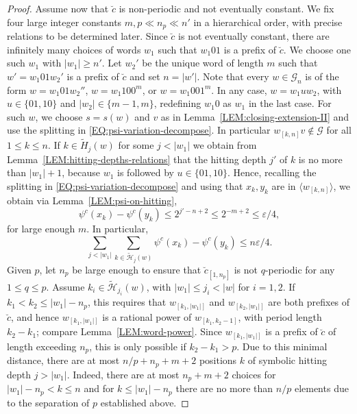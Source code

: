 \documentclass[11pt,reqno]{amsart}
\theoremstyle{plain}
\theoremstyle{definition}
\newcommand{\mc}{\mathcal}
\begin{document}
\begin{proof}
Assume now that $\breve{c}$ is non-periodic and not eventually constant.
We fix four large integer constants $m, p \ll n_p \ll n'$ in a hierarchical order, with precise relations to be determined later. Since $\breve{c}$ is not eventually constant, there are infinitely many choices of words $w_1$ such that $w_1 01$ is a prefix of $\breve{c}$. We choose one such $w_1$ with $|w_1| \geqslant n'$. Let $w_2'$ be the unique word of length $m$ such that $w' = w_1 01 w_2'$ is a prefix of $\breve{c}$ and set $n = |w'|$. 
Note that every $w \in \mc G_n$ is of the form $w = w_1 01 w_2''$, $w = w_1 10 0^m$, or $w = w_1 00 1^m$. In any case, $w = w_1 u w_2$,
with $u \in \{01,10\}$ and $|w_2| \in \{m-1,m\}$, redefining $w_1 0$ as $w_1$ in the last case.
For such $w$, we choose $s=s(w)$ and $v$ as in Lemma~\ref{LEM:closing-extension-II} and use the splitting in \eqref{EQ:psi-variation-decompose}. In particular $w_{[k,n]}v \notin \mc G$ for all $1 \leqslant k \leqslant n$.
If $k \in \widetilde{H}_{j}(w)$ for some $j<|w_1|$ 
we obtain from Lemma~\ref{LEM:hitting-depths-relations} that the hitting depth $j'$ of $k$ is no more than $|w_1| + 1$,
because $w_1$ is followed by $u \in \{01,10\}$.
Hence, recalling the splitting in \eqref{EQ:psi-variation-decompose} and using that $x_{k},y_k$ are in $\langle w_{[k,n]}\rangle$, we obtain via Lemma~\ref{LEM:psi-on-hitting},
 \[
\psi^c(x_k) - \psi^c(y_k) \leqslant 2^{j'-n+2} \leqslant 2^{-m+2} \leqslant \varepsilon/4,
\]
for large enough $m$. In particular,
\[
\sum_{j < |w_1|} \sum_{k \in \widetilde{\mc H}_j(w)} \psi^c(x_k) - \psi^c(y_k) \leqslant n \varepsilon/4.
\]
Given $p$, let $n_p$ be large enough to ensure that $\breve{c}_{[1,n_p]}$ is not $q$-periodic for any $1\leqslant q \leqslant p$. 
Assume $k_i \in \widetilde{\mc H}_{j_i}(w)$, with $|w_1| \leqslant j_i < |w|$ for $i =1,2$.
If $k_1 < k_2 \leqslant |w_1|- n_p$, this requires that $w_{[k_1,|w_1|]}$ and $w_{[k_2,|w_1|]}$ are both prefixes of $\breve{c}$, and hence $w_{[k_1,|w_1|]}$ is a rational power of $w_{[k_1,k_2-1]}$, with period length $k_2 - k_1$; compare Lemma~\ref{LEM:word-power}. 
Since $w_{[k_1,|w_1|]}$ is a prefix of $\breve{c}$ of length exceeding $n_p$, this is only possible if $k_2 - k_1 > p$. Due to this minimal distance, there are at most $n/p + n_p + m  + 2$ positions $k$ of symbolic hitting depth $j > |w_1|$. Indeed, there are at most $n_p + m + 2$ choices for $|w_1| - n_p < k \leqslant n$ and for $k \leqslant |w_1| - n_p$ there are no more than $n/p$ elements due to the separation of $p$ established above.


\end{proof}
\end{document}
